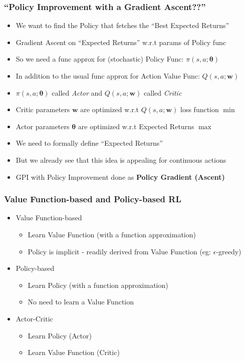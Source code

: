 \documentclass[handout]{beamer}
\begin{document}
\begin{frame}
\frametitle{``Policy Improvement with a Gradient Ascent??''}
\pause
\begin{itemize}[<+->]
\item We want to find the Policy that fetches the ``Best Expected Returns''
\item Gradient Ascent on ``Expected Returns'' w.r.t params of Policy func
\item So we need a func approx for (stochastic) Policy Func: $\pi(s, a; \bm{\theta})$
\item In addition to the usual func approx for Action Value Func: $Q(s, a; \bm{w})$
\item $\pi(s, a; \bm{\theta})$ called {\em Actor} and $Q(s, a; \bm{w})$ called {\em Critic}
\item Critic parameters $\bm{w}$ are optimized w.r.t $Q(s, a; \bm{w})$ loss function $\min$
\item Actor parameters $\bm{\theta}$ are optimized w.r.t Expected Returns $\max$
\item We need to formally define ``Expected Returns''
\item But we already see that this idea is appealing for continuous actions
\item GPI with Policy Improvement done as {\bf Policy Gradient (Ascent)}
\end{itemize}
\end{frame}

\begin{frame}
\frametitle{Value Function-based and Policy-based RL}
\pause
\begin{itemize}[<+->]
\item Value Function-based
\begin{itemize}
\item Learn Value Function (with a function approximation)
\item Policy is implicit - readily derived from Value Function (eg: $\epsilon$-greedy)
\end{itemize}
\item Policy-based
\begin{itemize}
\item Learn Policy (with a function approximation)
\item No need to learn a Value Function
\end{itemize}
\item Actor-Critic
\begin{itemize}
\item Learn Policy (Actor)
\item Learn Value Function (Critic)
\end{itemize}
\end{itemize}
\end{frame}
\end{document}
